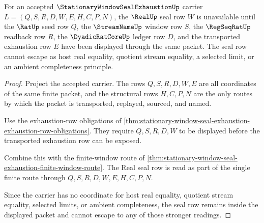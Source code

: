 \begin{theorem}
\label{thm:stationary-window-seal-exhaustion-real-seal-nonescape}
For an accepted $\StationaryWindowSealExhaustionUp$ carrier $L=(Q,S,R,D,W,E,H,C,P,N)$, the $\RealUp$ seal row $W$ is unavailable until the $\RatUp$ seed row $Q$, the $\StreamNameUp$ window row $S$, the $\RegSeqRatUp$ readback row $R$, the $\DyadicRatCoreUp$ ledger row $D$, and the transported exhaustion row $E$ have been displayed through the same packet. The seal row cannot escape as host real equality, quotient stream equality, a selected limit, or an ambient completeness principle.
\end{theorem}
\begin{proof}
Project the accepted carrier. The rows $Q,S,R,D,W,E$ are all coordinates of the same finite packet, and the structural rows $H,C,P,N$ are the only routes by which the packet is transported, replayed, sourced, and named.

Use the exhaustion-row obligations of \autoref{thm:stationary-window-seal-exhaustion-exhaustion-row-obligations}. They require $Q,S,R,D,W$ to be displayed before the transported exhaustion row can be exposed.

Combine this with the finite-window route of \autoref{thm:stationary-window-seal-exhaustion-finite-window-route}. The Real seal row is read as part of the single finite route through $Q,S,R,D,W,E,H,C,P,N$.

Since the carrier has no coordinate for host real equality, quotient stream equality, selected limits, or ambient completeness, the seal row remains inside the displayed packet and cannot escape to any of those stronger readings.
\end{proof}

